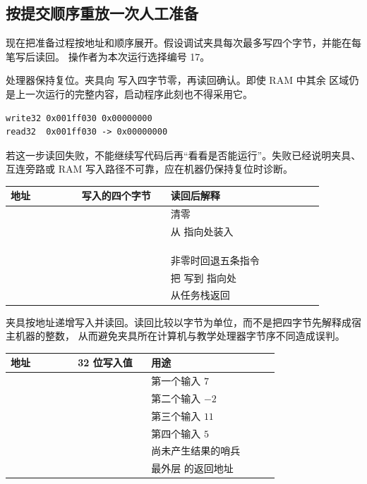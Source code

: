 \subsection{按提交顺序重放一次人工准备}

现在把准备过程按地址和顺序展开。假设调试夹具每次最多写四个字节，并能在每笔写后读回。
操作者为本次运行选择编号 17。


处理器保持复位。夹具向  写入四字节零，再读回确认。即使 RAM 中其余
区域仍是上一次运行的完整内容，启动程序此刻也不得采用它。

\begin{lstlisting}
write32 0x001ff030 0x00000000
read32  0x001ff030 -> 0x00000000
\end{lstlisting}

若这一步读回失败，不能继续写代码后再“看看是否能运行”。失败已经说明夹具、互连旁路或
RAM 写入路径不可靠，应在机器仍保持复位时诊断。


\begin{longtable}{|L{0.20\linewidth}|L{0.25\linewidth}|L{0.43\linewidth}|}
\hline
{}
地址 & 写入的四个字节 & 读回后解释 \\ \hline
{} &  & 清零  \\ \hline
{} &  & 从  指向处装入  \\ \hline
{} &  &  \\ \hline
{} &  &  \\ \hline
{} &  &  \\ \hline
{} &  & 非零时回退五条指令 \\ \hline
{} &  & 把  写到  指向处 \\ \hline
{} &  & 从任务栈返回 \\ \hline
\end{longtable}

夹具按地址递增写入并读回。读回比较以字节为单位，而不是把四字节先解释成宿主机器的整数，
从而避免夹具所在计算机与教学处理器字节序不同造成误判。


\begin{longtable}{|L{0.22\linewidth}|L{0.24\linewidth}|L{0.42\linewidth}|}
\hline
{}
地址 & 32 位写入值 & 用途 \\ \hline
{} &  & 第一个输入 \(7\) \\ \hline
{} &  & 第二个输入 \(-2\) \\ \hline
{} &  & 第三个输入 \(11\) \\ \hline
{} &  & 第四个输入 \(5\) \\ \hline
{} &  & 尚未产生结果的哨兵 \\ \hline
{} &  & 最外层  的返回地址 \\ \hline
\end{longtable}

